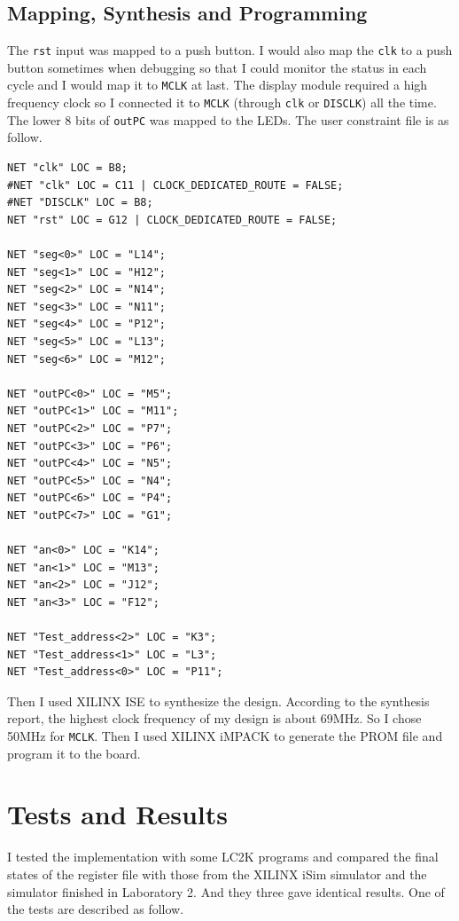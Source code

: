 \documentclass[a4paper]{article}
\begin{document}
\subsection{Mapping, Synthesis and Programming}
The \verb|rst| input was mapped to a push button. I would also map the \verb|clk| to a push button sometimes
when debugging so that I could monitor the status in each cycle and I would map it to \verb|MCLK| at last.
The display module required a high frequency clock so I connected it to \verb|MCLK| (through \verb|clk| or
\verb|DISCLK|) all the time. The lower 8 bits of \verb|outPC| was mapped to the LEDs.
The user constraint file is as follow.
\begin{verbatim}
NET "clk" LOC = B8;
#NET "clk" LOC = C11 | CLOCK_DEDICATED_ROUTE = FALSE;
#NET "DISCLK" LOC = B8;
NET "rst" LOC = G12 | CLOCK_DEDICATED_ROUTE = FALSE;

NET "seg<0>" LOC = "L14";
NET "seg<1>" LOC = "H12";
NET "seg<2>" LOC = "N14";
NET "seg<3>" LOC = "N11";
NET "seg<4>" LOC = "P12";
NET "seg<5>" LOC = "L13";
NET "seg<6>" LOC = "M12";

NET "outPC<0>" LOC = "M5";
NET "outPC<1>" LOC = "M11";
NET "outPC<2>" LOC = "P7";
NET "outPC<3>" LOC = "P6";
NET "outPC<4>" LOC = "N5";
NET "outPC<5>" LOC = "N4";
NET "outPC<6>" LOC = "P4";
NET "outPC<7>" LOC = "G1";

NET "an<0>" LOC = "K14";
NET "an<1>" LOC = "M13";
NET "an<2>" LOC = "J12";
NET "an<3>" LOC = "F12";

NET "Test_address<2>" LOC = "K3";
NET "Test_address<1>" LOC = "L3";
NET "Test_address<0>" LOC = "P11";
\end{verbatim}

Then I used XILINX ISE to synthesize the design. According to the synthesis report, the highest clock
frequency of my design is about 69MHz. So I chose 50MHz for \verb|MCLK|. Then I used XILINX iMPACK to
generate the PROM file and program it to the board.

\section{Tests and Results}
I tested the implementation with some LC2K programs and compared the final states of the register file
with those from the XILINX iSim simulator and the simulator finished in Laboratory 2. And they three
gave identical results. One of the tests are described as follow.
\end{document}
